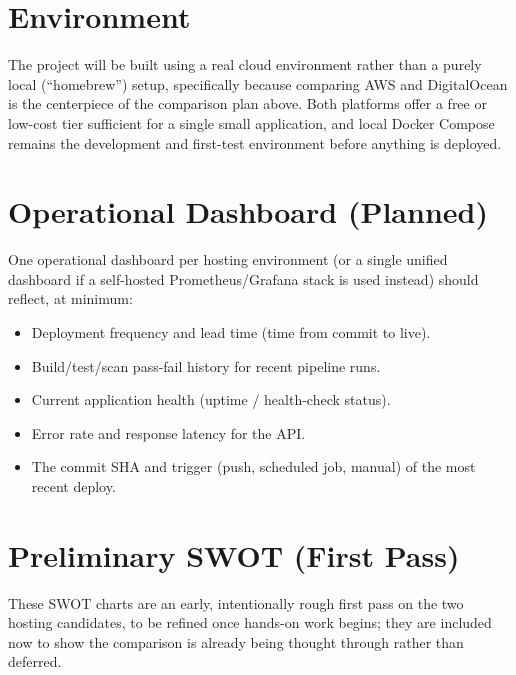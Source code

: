 \section{Environment}
The project will be built using a real cloud environment rather than a
purely local (``homebrew'') setup, specifically because comparing AWS and
DigitalOcean is the centerpiece of the comparison plan above. Both platforms
offer a free or low-cost tier sufficient for a single small application, and
local Docker Compose remains the development and first-test environment
before anything is deployed.

\section{Operational Dashboard (Planned)}
\label{Section:Dashboard}
One operational dashboard per hosting environment (or a single unified
dashboard if a self-hosted Prometheus/Grafana stack is used instead) should
reflect, at minimum:
\begin{itemize}
\item Deployment frequency and lead time (time from commit to live).
\item Build/test/scan pass-fail history for recent pipeline runs.
\item Current application health (uptime / health-check status).
\item Error rate and response latency for the API.
\item The commit SHA and trigger (push, scheduled job, manual) of the most recent deploy.
\end{itemize}

\section{Preliminary SWOT (First Pass)}
These SWOT charts are an early, intentionally rough first pass on the two
hosting candidates, to be refined once hands-on work begins; they are
included now to show the comparison is already being thought through rather
than deferred.

